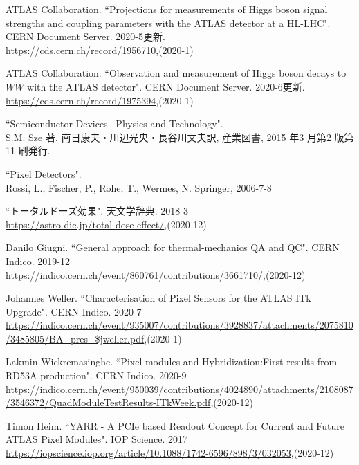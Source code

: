\begin{thebibliography}{9}

ATLAS Collaboration. ``Projections for measurements of Higgs boson signal strengths and coupling parameters with the ATLAS detector at a HL-LHC". CERN Document Server. 2020-5更新.\\
\url{https://cds.cern.ch/record/1956710},(2020-1)

ATLAS Collaboration. ``Observation and measurement of Higgs boson decays to $WW$ with the ATLAS detector". CERN Document Server. 2020-6更新.\\
\url{https://cds.cern.ch/record/1975394},(2020-1)

``Semiconductor Devices –Physics and Technology".\\
S.M. Sze 著, 南日康夫・川辺光央・長谷川文夫訳, 産業図書, 2015 年3 月第2 版第11 刷発行.

``Pixel Detectors". \\
Rossi, L., Fischer, P., Rohe, T., Wermes, N. Springer, 2006-7-8

``トータルドーズ効果". 天文学辞典. 2018-3\\
\url{https://astro-dic.jp/total-dose-effect/},(2020-12)

Danilo Giugni. ``General approach for thermal-mechanics QA and QC". CERN Indico. 2019-12\\
\url{https://indico.cern.ch/event/860761/contributions/3661710/},(2020-12)

Johannes Weller. ``Characterisation of Pixel Sensors for the ATLAS ITk Upgrade". CERN Indico. 2020-7\\
\url{https://indico.cern.ch/event/935007/contributions/3928837/attachments/2075810/3485805/BA_pres_$jweller.pdf},(2020-1)

Lakmin Wickremasinghe. ``Pixel modules and Hybridization:First results from RD53A production". CERN Indico. 2020-9\\
\url{https://indico.cern.ch/event/950039/contributions/4024890/attachments/2108087/3546372/QuadModuleTestResults-ITkWeek.pdf},(2020-12)

Timon Heim. ``YARR - A PCIe based Readout Concept for Current and Future ATLAS Pixel Modules". IOP Science. 2017\\
\url{https://iopscience.iop.org/article/10.1088/1742-6596/898/3/032053},(2020-12)


\end{thebibliography}
